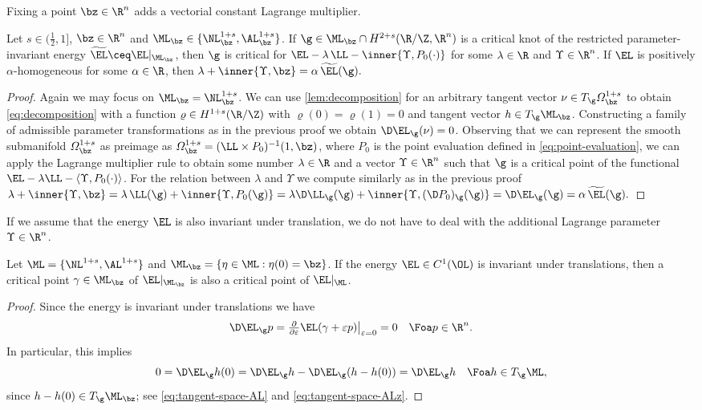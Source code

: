 Fixing a point $\bz\in\R^n$ adds a vectorial constant Lagrange multiplier.
\begin{corollary}
\label{cor:critical-points}
Let $s\in (\frac{1}{2},1]$, $\bz\in\R^n$ and $ \ML_{\bz}\in \{\NL^{1+s}_{\bz},\AL^{1+s}_{\bz}\} $. If $\g\in\ML_{\bz}\cap
H^{2+s}(\R/\Z,\R^n)$ is a critical knot of the restricted 
parameter-invariant energy
$\widetilde{\EL}\ceq\EL|_{\ML_{\bz}}$, then $\g$ is critical for
$\EL-\lambda \, \LL- \inner{\Upsilon,P_0(\cdot)}$ for some
$\lambda\in\R$ and $\Upsilon\in\R^n$. 
If $\EL$ is 
positively $\alpha$-homogeneous for some $\alpha\in\R$,
then $\lambda + \inner{\Upsilon,\bz}=\alpha \, \widetilde{\EL}(\g).$
\end{corollary}
\begin{proof}Again we may focus on $ \ML_{\bz}=\NL^{1+s}_{\bz} $.
We can use \cref{lem:decomposition} for an arbitrary tangent vector
$\nu\in T_\g\varOmega^{1+s}_\bz$ to obtain \cref{eq:decomposition}
with a function $\varrho\in H^{1+s}(\R/\Z)$ with $\varrho(0)=\varrho(1)=0$
and tangent vector $h\in T_\g\ML_{\bz}$. Constructing a family of
admissible parameter transformations as in the previous proof we obtain
$\D\EL_\g(\nu)=0$. Observing that we can represent 
the smooth submanifold $\varOmega_\bz^{1+s}$ as
preimage as $\varOmega_\bz^{1+s}=(\LL\times P_0)^{-1}(1,\bz)$,
where $P_0$ is the point evaluation defined in \cref{eq:point-evaluation},
we can apply the
Lagrange multiplier rule
\cite[Corollary 3.5.29]{abraham-etal_1988}
to obtain some number $\lambda\in\R$ and a vector $\Upsilon\in\R^n$ such
that $\g$ is a critical point of the functional $\EL-\lambda\LL -\langle
\Upsilon,P_0(\cdot)\rangle$. 
For the relation between $\lambda$ and $\Upsilon$ we compute similarly
as in the previous proof $ \lambda + \inner{\Upsilon,\bz}
	 =
	\lambda \, \LL(\g) + \inner{\Upsilon,P_0(\g)}
	=
	\lambda \D\LL_\g(\g) + \inner{ \Upsilon,(\D P_0)_\g(\g) }
	=
	\D\EL_\g(\g)
	= 
	\alpha \, \widetilde{\EL}(\g). $
\end{proof}

If we assume  
that the energy $\EL$ is also invariant under translation, 
we do not have to deal with the  additional
Lagrange parameter $\Upsilon\in\R^n$.

\begin{lemma}\label{cor:critical-points_wo_fixed_point}
Let $ \ML=\{\NL^{1+s},\AL^{1+s}\} $ and $ \ML_{\bz}=\{\eta\in \ML:\eta(0)=\bz\} $. If the energy $\EL\in C^1(\OL)$ is invariant under translations, then 
a critical point $\gamma \in \ML_\bz$ of $\EL|_{\ML_\bz}$ is also a 
critical point of $\EL|_{\ML}$.
\end{lemma}
\begin{proof}
	Since the energy is invariant under translations we have 
\[
	\textstyle
	\D\EL_\g p
	=
	\frac{\partial}{\partial\varepsilon}
	\EL(\gamma+\varepsilon p)
	\big|_{\varepsilon=0}
	=
	0\quad\Foa p\in\R^n
	.
\]
In particular, this implies
\[
	\textstyle
	0=\D\EL_\g h(0)
	=
	\D\EL_\g h - \D\EL_\g (h-h(0))
	=
	\D\EL_\g h
	\quad
	\Foa
	h\in T_\g\ML
	,
\]
since $h-h(0)\in T_\g\ML_\bz$;  see \cref{eq:tangent-space-AL} and
\cref{eq:tangent-space-ALz}.
\end{proof}
